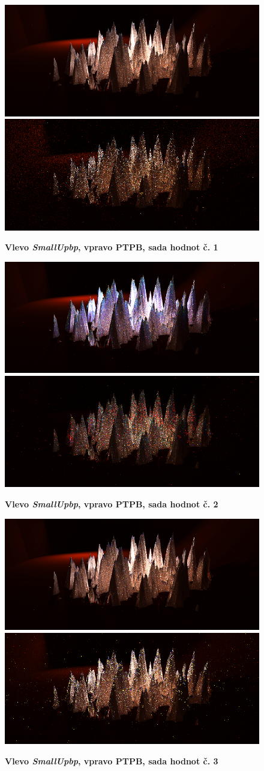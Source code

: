 \begin{figure}[H]\centering
\includegraphics[width=0.5\linewidth]{obrazky-figures/test-smallupbb-1-2h.png}\hfill
\includegraphics[width=0.5\linewidth]{obrazky-figures/test-ptpb-1-2h.png}\hfill
  \caption{\textbf{Vlevo \textit{SmallUpbp}, vpravo PTPB, sada hodnot č. 1}}
  \label{mereni-1}
\end{figure}
\begin{figure}[H]\centering
\includegraphics[width=0.5\linewidth]{obrazky-figures/test-smallupbb-2-2h.png}\hfill
\includegraphics[width=0.5\linewidth]{obrazky-figures/test-ptpb-2-10m.png}\hfill
  \caption{\textbf{Vlevo \textit{SmallUpbp}, vpravo PTPB, sada hodnot č. 2}}
  \label{mereni-2}
\end{figure}
\begin{figure}[H]\centering
\includegraphics[width=0.5\linewidth]{obrazky-figures/test-smallupbb-3-2h.png}\hfill
\includegraphics[width=0.5\linewidth]{obrazky-figures/test-ptpb-3-2h.png}\hfill
  \caption{\textbf{Vlevo \textit{SmallUpbp}, vpravo PTPB, sada hodnot č. 3}}
  \label{mereni-3}
\end{figure}
